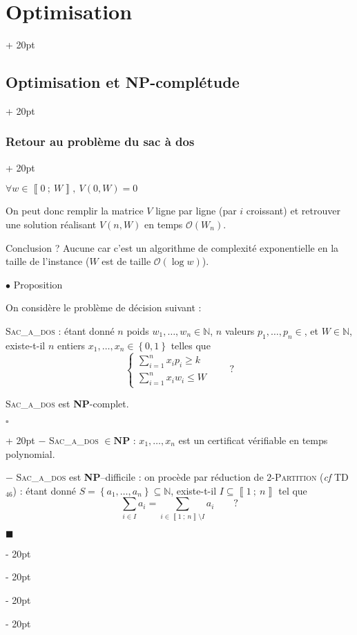 \documentclass[a4paper, 12pt, twoside]{article}
\newcommand{\N}{\mathbb{N}} %
\newcommand{\nset}[2]{\left\llbracket #1\ ;\ #2 \right\rrbracket}
\newcommand{\set}[1]{\left\{ #1 \right\}}
\renewcommand{\le}{\leqslant}
\renewcommand{\ge}{\geqslant}
\newcommand{\ind}[1][20pt]{\advance\leftskip + #1}
\newcommand{\deind}[1][20pt]{\advance\leftskip - #1}
\newenvironment{indt}[2][20pt]{#2 \par \ind[#1]}{\par \deind} %
\newenvironment{proof}[1][{}]{\begin{indt}{$\square$ #1}}{$\blacksquare$ \end{indt}}
\newcommand{\1}{\mathbbm 1}
\begin{document}
\begin{indt}{\section{Optimisation}}
\begin{indt}{\subsection{Optimisation et \textbf{NP}-complétude}}
\begin{indt}{\subsubsection{Retour au problème du sac à dos}}
                \vspace{12pt}

                $\forall w \in \nset 0 W,\ V(0, W) = 0$

                On peut donc remplir la matrice $V$ ligne par ligne (par $i$ croissant) et retrouver une solution réalisant $V(n, W)$ en temps $\mathcal O(W_n)$.

                Conclusion ? Aucune car c'est un algorithme de complexité exponentielle en la taille de l'instance ($W$ est de taille $\mathcal O(\log w)$).

                \vspace{12pt}
                
                $\bullet$ Proposition

                \begin{emphBox}
                    On considère le problème de décision suivant :

                    \textsc{Sac\_a\_dos} : étant donné $n$ poids $w_1, \ldots, w_n \in \N$, $n$ valeurs $p_1, \ldots, p_n \in$, et $W \in \N$, existe-t-il $n$ entiers $x_1, \ldots, x_n \in \set{0, 1}$ telles que
                    \[
                        \begin{cases}
                            \displaystyle
                            \sum_{i = 1}^n x_i p_i \ge k
                            \\
                            \displaystyle
                            \sum_{i = 1}^n x_i w_i \le W
                        \end{cases}
                        \qquad
                        \text{?}
                    \]

                    \vspace{6pt}
                    
                    \textsc{Sac\_a\_dos} est \textbf{NP}-complet.
                \end{emphBox}

                \vspace{6pt}
                
                \begin{proof}
                    $-$ \textsc{Sac\_a\_dos} $\in \mathbf{NP}$ : $x_1, \ldots, x_n$ est un certificat vérifiable en temps polynomial.

                    \vspace{6pt}
                    
                    $-$ \textsc{Sac\_a\_dos} est \textbf{NP}--difficile : on procède par réduction de $2$-\textsc{Partition} (\textit{cf} TD$_{46}$) : étant donné $S = \set{a_1, \ldots, a_n} \subseteq \N$, existe-t-il $I \subseteq \nset 1 n$ tel que
                    \[
                        \sum_{i \in I} a_i = \sum_{i \in \nset 1 n \setminus I} a_i
                        \qquad \text{?}
                    \]


\end{proof}
\end{indt}
\end{indt}
\end{indt}
\end{document}
